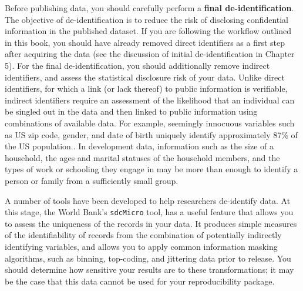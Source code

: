 Before publishing data,
you should carefully perform a \textbf{final de-identification}.
The objective of de-identification is to reduce the risk of disclosing confidential information in the published dataset.
If you are following the workflow outlined in this book,
you should have already removed direct identifiers as a first step after acquiring the data
(see the discussion of initial de-identification in Chapter 5).
For the final de-identification, you should additionally remove
indirect identifiers, and assess the statistical disclosure risk of your data.
Unlike direct identifiers, for which a link (or lack thereof) to public information is verifiable,
indirect identifiers require an assessment of the likelihood
that an individual can be singled out in the data
and then linked to public information using combinations of available data.
For example, seemingly innocuous variables such as US zip code, 
gender, and date of birth uniquely identify approximately 87\% of the US population.\cite{Sweeney2000}. 
In development data, information such as the size of a household,
the ages and marital statuses of the household members,
and the types of work or schooling they engage in
may be more than enough to identify a person or family
from a sufficiently small group.

A number of tools have been developed to help researchers de-identify data.
At this stage, the World Bank's \texttt{sdcMicro} tool,
has a useful feature
that allows you to assess the uniqueness of the records in your data.
It produces simple measures of the identifiability of records from
the combination of potentially indirectly identifying variables,
and allows you to apply common information masking algorithms,
such as binning, top-coding, and jittering data prior to release.
You should determine how sensitive your results are to these transformations;
it may be the case that this data cannot be used for your reproducibility package.

